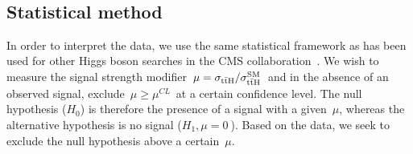 \begin{figure}
\begin{centering}
 \\
\caption[The modelling of the kinematic distributions in the dileptonic control region]{}
\label{fig:tth_dl_control}
\end{centering}
\end{figure}


\subsection{Statistical method}
\label{sec:statistical_method}
In order to interpret the data, we use the same statistical framework as has been used for other Higgs boson searches in the CMS collaboration~\cite{Chatrchyan:2012xdj,Chatrchyan:2012tx,ATLAS:2011tau}. We wish to measure the signal strength modifier~$\mu = \sigma_{\mathrm{t} \bar{\mathrm{t}} \mathrm{H}}/\sigma_{\mathrm{t} \bar{\mathrm{t}} \mathrm{H}}^{\mathrm{SM}}$~and in the absence of an observed signal, exclude~$\mu \ge \mu^{CL}$~at a certain confidence level. The null hypothesis ($H_0$) is therefore the presence of a signal with a given~$\mu$, whereas the alternative hypothesis is no signal ($H_1, \mu = 0~$). Based on the data, we seek to exclude the null hypothesis above a certain~$\mu$.

